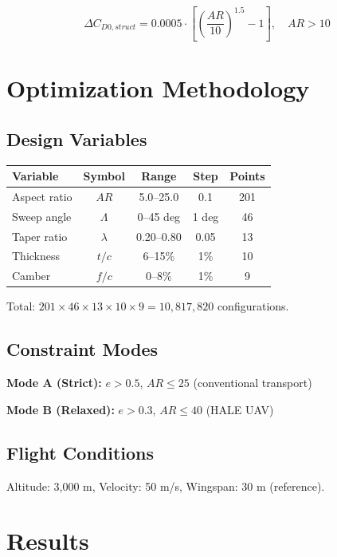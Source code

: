 \documentclass[11pt,a4paper]{article}
\begin{document}
\begin{equation}
\Delta C_{D0,struct} = 0.0005 \cdot \left[\left(\frac{AR}{10}\right)^{1.5} - 1\right], \quad AR > 10
\end{equation}

\section{Optimization Methodology}

\subsection{Design Variables}

\begin{center}
\begin{tabular}{|l|c|c|c|c|}
\hline
Variable & Symbol & Range & Step & Points \\
\hline
Aspect ratio & $AR$ & 5.0--25.0 & 0.1 & 201 \\
Sweep angle & $\Lambda$ & 0--45 deg & 1 deg & 46 \\
Taper ratio & $\lambda$ & 0.20--0.80 & 0.05 & 13 \\
Thickness & $t/c$ & 6--15\% & 1\% & 10 \\
Camber & $f/c$ & 0--8\% & 1\% & 9 \\
\hline
\end{tabular}
\end{center}

Total: $201 \times 46 \times 13 \times 10 \times 9 = 10,817,820$ configurations.

\subsection{Constraint Modes}

\textbf{Mode A (Strict):} $e > 0.5$, $AR \leq 25$ (conventional transport)

\textbf{Mode B (Relaxed):} $e > 0.3$, $AR \leq 40$ (HALE UAV)

\subsection{Flight Conditions}

Altitude: 3,000 m, Velocity: 50 m/s, Wingspan: 30 m (reference).

\section{Results}
\end{document}
